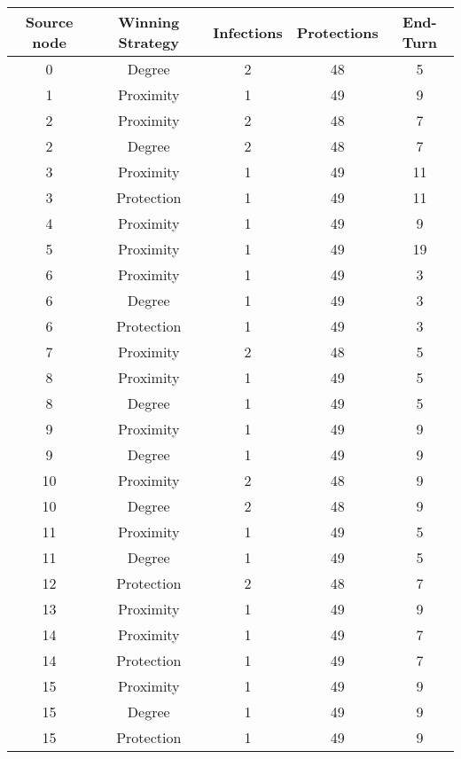 \documentclass[results.tex]{subfiles}
\begin{document}
\begin{center}
  \begin{tabular}{| c || c | c | c | c |}
    \hline
    {\bfseries Source node} & {\bfseries Winning Strategy} & {\bfseries Infections} & {\bfseries Protections} & {\bfseries End-Turn} \\  %
    \hline\hline
    0 & Degree & 2 & 48 & 5 \\ 
    \hline
    1 & Proximity & 1 & 49 & 9 \\ 
    \hline
    2 & Proximity & 2 & 48 & 7 \\ 
    \hline
    2 & Degree & 2 & 48 & 7 \\ 
    \hline
    3 & Proximity & 1 & 49 & 11 \\ 
    \hline
    3 & Protection & 1 & 49 & 11 \\ 
    \hline
    4 & Proximity & 1 & 49 & 9 \\ 
    \hline
    5 & Proximity & 1 & 49 & 19 \\ 
    \hline
    6 & Proximity & 1 & 49 & 3 \\ 
    \hline
    6 & Degree & 1 & 49 & 3 \\ 
    \hline
    6 & Protection & 1 & 49 & 3 \\ 
    \hline
    7 & Proximity & 2 & 48 & 5 \\ 
    \hline
    8 & Proximity & 1 & 49 & 5 \\ 
    \hline
    8 & Degree & 1 & 49 & 5 \\ 
    \hline
    9 & Proximity & 1 & 49 & 9 \\ 
    \hline
    9 & Degree & 1 & 49 & 9 \\ 
    \hline
    10 & Proximity & 2 & 48 & 9 \\ 
    \hline
    10 & Degree & 2 & 48 & 9 \\ 
    \hline
    11 & Proximity & 1 & 49 & 5 \\ 
    \hline
    11 & Degree & 1 & 49 & 5 \\ 
    \hline
    12 & Protection & 2 & 48 & 7 \\ 
    \hline
    13 & Proximity & 1 & 49 & 9 \\ 
    \hline
    14 & Proximity & 1 & 49 & 7 \\ 
    \hline
    14 & Protection & 1 & 49 & 7 \\ 
    \hline
    15 & Proximity & 1 & 49 & 9 \\ 
    \hline
    15 & Degree & 1 & 49 & 9 \\ 
    \hline
    15 & Protection & 1 & 49 & 9 \\ 

\end{tabular}
\end{center}
\end{document}
